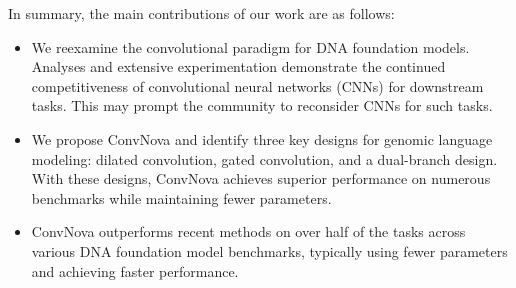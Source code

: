 In summary, 
the main contributions of our work 
are 
as follows:
\begin{itemize}

\item We reexamine the convolutional paradigm for DNA foundation models. Analyses and extensive experimentation demonstrate the continued competitiveness of convolutional neural networks (CNNs) for downstream tasks. This may prompt the community to reconsider CNNs for such tasks.

\item We propose ConvNova and identify three key designs for genomic language modeling: dilated convolution, gated convolution, and a dual-branch design. With these designs, ConvNova achieves superior performance on numerous benchmarks while maintaining fewer parameters.

\item ConvNova outperforms recent methods on over half of the tasks across various DNA foundation model benchmarks, typically using fewer parameters and achieving faster performance.

\end{itemize}
    
